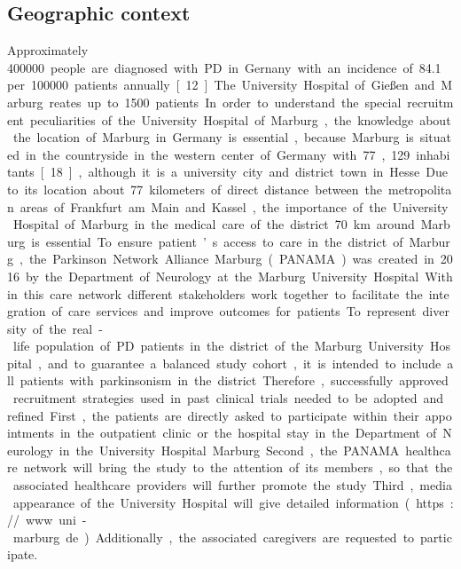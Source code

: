 \documentclass[
	a4paper, 
	11.5pt,
	headings=small, 
	twoside, 
	titlepage=firstiscover, 
 	pagesize=auto,
  	version=last,
	open=any,
	BCOR=14mm,
  	chapterprefix=false]{scrbook}
\newcommand{\UKGM}[1]{University Hospital of Gießen and Marburg}
\begin{document}
\subsection{Geographic context}
Approximately \SI{400000} people are diagnosed with \ac{PD} in Gernany with an incidence of \SI{84.1} per \SI{100000} patients annually [12]. The \UKGM treates up to 1500 patients. In order to understand the special recruitment peculiarities of the University Hospital of Marburg, the knowledge about the location of Marburg in Germany is essential, because Marburg is situated in the countryside in the western center of Germany with 77,129 inhabitants [18], although it is a university city and district town in Hesse. Due to its location about 77 kilometers of direct distance between the metropolitan areas of Frankfurt am Main and Kassel, the importance of the University Hospital of Marburg in the medical care of the district 70 km around Marburg is essential. To ensure patient’s access to care in the district of Marburg, the Parkinson Network Alliance Marburg (PANAMA) was created in 2016 by the Department of Neurology at the Marburg University Hospital. Within this care network different stakeholders work together to facilitate the integration of care services and improve outcomes for patients. 

To represent diversity of the real-life population of PD patients in the district of the Marburg University Hospital, and to guarantee a balanced study cohort, it is intended to include all patients with parkinsonism in the district. Therefore, successfully approved recruitment strategies used in past clinical trials needed to be adopted and refined. First, the patients are directly asked to participate within their appointments in the outpatient clinic or the hospital stay in the Department of Neurology in the University Hospital Marburg. Second, the PANAMA healthcare network will bring the study to the attention of its members, so that the associated healthcare providers will further promote the study. Third, media appearance of the University Hospital will give detailed information (https://www.uni-marburg.de). Additionally, the associated caregivers are requested to participate. 
\end{document}

